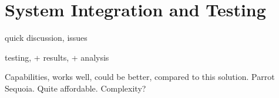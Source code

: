 \chapter{System Integration and Testing}

quick discussion, issues

testing, + results, + analysis

Capabilities, works well, could be better, compared to this solution. Parrot Sequoia. Quite affordable. Complexity?